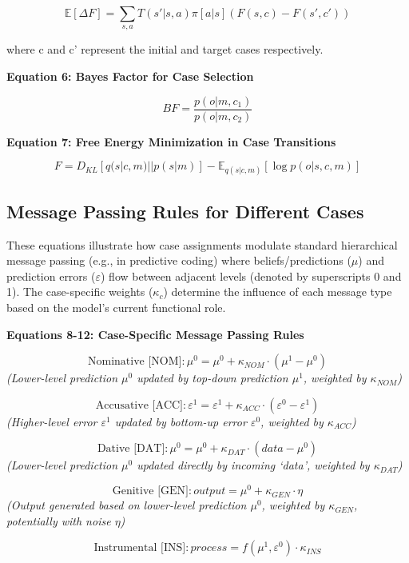\documentclass[
]{book}
\begin{document}
\[
\mathbb{E}[\Delta F] = \sum_{s,a}T(s'|s,a)\pi[a|s](F(s,c)-F(s',c'))  \tag{5}
\]

where c and c' represent the initial and target cases respectively.

\textbf{Equation 6: Bayes Factor for Case Selection}

\[BF = \frac{p(o|m,c_1)}{p(o|m,c_2)}  \tag{6}\]

\textbf{Equation 7: Free Energy Minimization in Case Transitions}

\[
F = D_{KL}[q(s|c,m) || p(s|m)] - \mathbb{E}_{q(s|c,m)}[\log p(o|s,c,m)]  \tag{7}
\]

\hypertarget{message-passing-rules-for-different-cases}{%
\subsection{Message Passing Rules for Different
Cases}\label{message-passing-rules-for-different-cases}}

These equations illustrate how case assignments modulate standard
hierarchical message passing (e.g., in predictive coding) where
beliefs/predictions (\(\mu\)) and prediction errors (\(\varepsilon\))
flow between adjacent levels (denoted by superscripts 0 and 1). The
case-specific weights (\(\kappa_c\)) determine the influence of each
message type based on the model's current functional role.

\textbf{Equations 8-12: Case-Specific Message Passing Rules}

\[\text{Nominative [NOM]}: \mu^0 = \mu^0 + \kappa_{NOM} \cdot (\mu^1 - \mu^0)  \tag{8}\]
\emph{(Lower-level prediction \(\mu^0\) updated by top-down prediction
\(\mu^1\), weighted by \(\kappa_{NOM}\))}

\[\text{Accusative [ACC]}: \varepsilon^1 = \varepsilon^1 + \kappa_{ACC} \cdot (\varepsilon^0 - \varepsilon^1)  \tag{9}\]
\emph{(Higher-level error \(\varepsilon^1\) updated by bottom-up error
\(\varepsilon^0\), weighted by \(\kappa_{ACC}\))}

\[\text{Dative [DAT]}: \mu^0 = \mu^0 + \kappa_{DAT} \cdot (data - \mu^0)  \tag{10}\]
\emph{(Lower-level prediction \(\mu^0\) updated directly by incoming
`data', weighted by \(\kappa_{DAT}\))}

\[\text{Genitive [GEN]}: output = \mu^0 + \kappa_{GEN} \cdot \eta  \tag{11}\]
\emph{(Output generated based on lower-level prediction \(\mu^0\),
weighted by \(\kappa_{GEN}\), potentially with noise \(\eta\))}

\[\text{Instrumental [INS]}: process = f(\mu^1, \varepsilon^0) \cdot \kappa_{INS} \tag{12}\]
\end{document}
